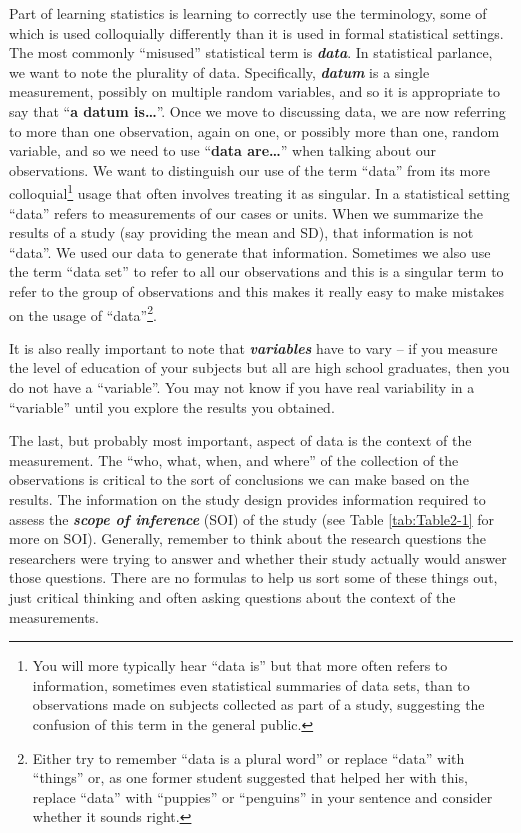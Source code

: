 \documentclass[
]{book}
\begin{document}
Part of learning statistics is learning to correctly use the terminology, some of which is used colloquially
differently than it is used in formal statistical settings. The most commonly
``misused'' statistical term is \textbf{\emph{data}}.   In statistical parlance, we want to note the plurality of
data. Specifically, \textbf{\emph{datum}} is a single measurement, possibly on multiple random
variables, and so it is appropriate to say that ``\textbf{a datum is\ldots{}}''.
Once we move to discussing data, we are now referring to more than one
observation, again on one, or possibly more than one, random variable, and
so we need to use ``\textbf{data are\ldots{}}'' when talking about our observations. We want
to distinguish our use of the term ``data'' from its more
colloquial\footnote{You will more typically hear ``data is'' but that more often refers to
  information, sometimes even statistical summaries of data sets, than to
  observations made on subjects collected as part of a study, suggesting the confusion of this
  term in the general public.} usage that often involves treating it as singular.
In a statistical setting
``data'' refers to measurements of our cases or units. When we summarize the
results of a study (say providing the mean and SD), that information is not
``data''. We used our data to generate that information. Sometimes we also use
the term ``data set'' to refer to all our observations and this is a singular
term to refer to the group of observations and this makes it really easy to
make mistakes on the usage of ``data''\footnote{Either try to remember ``data is a plural word'' or replace ``data'' with ``things'' or, as one former student suggested that helped her with this, replace ``data'' with ``puppies'' or ``penguins'' in your sentence and consider whether it sounds right.}.

\indent It is also really important to note that \textbf{\emph{variables}} have to vary --
if you measure the level of education of your subjects but all are high school graduates, then you do
not have a ``variable''. You may not know if you have real variability in a
``variable'' until you explore the results you obtained.

\indent The last, but probably most important, aspect of data is the context
of the measurement. The ``who, what, when, and where'' of the collection
of the observations is critical to the
sort of conclusions we can make based on the results. The information on the
study design provides information required to assess the \textbf{\emph{scope of inference}} (SOI) of
the study (see Table \ref{tab:Table2-1} for more on SOI).  Generally, remember to think about the research questions the
researchers were trying to answer and whether their study actually would answer
those questions. There are no formulas to help us sort some of these things
out, just critical thinking and often asking questions about the context of the measurements.
\end{document}
